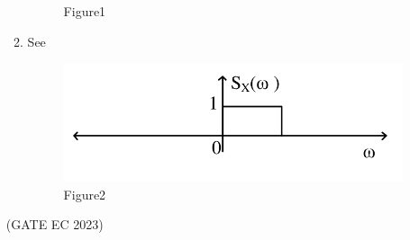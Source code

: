 \begin{enumerate}[label=\thechapter.\arabic*,ref=\thechapter.\theenumi]
\begin{enumerate}
\begin{figure}[ht]
    \caption{Figure1}
	\label{Fig:30,2022,Figure1}
\end{figure}
\item See 
\begin{figure}[ht!]
	\centering
	\includegraphics[width=\columnwidth]{gate/EC/2022/30/figs/fig2.png}
    \caption{Figure2}
	\label{Fig:30,2022,Figure2}
\end{figure}
\end{enumerate}
\hfill(GATE EC 2023)

\end{enumerate}
